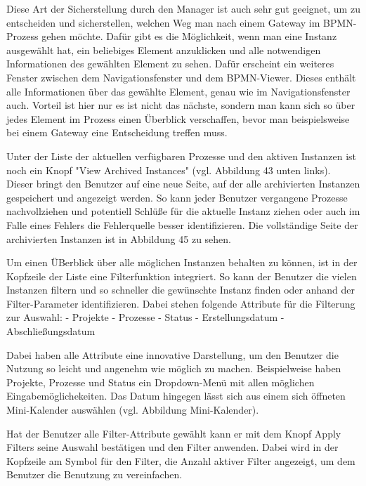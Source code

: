 Diese Art der Sicherstellung durch den Manager ist auch sehr gut geeignet, um zu entscheiden und sicherstellen, welchen Weg man nach einem Gateway im BPMN-Prozess gehen möchte. 
Dafür gibt es die Möglichkeit, wenn man eine Instanz ausgewählt hat, ein beliebiges Element anzuklicken und alle notwendigen Informationen des gewählten Element zu sehen. Dafür erscheint ein weiteres Fenster zwischen dem Navigationsfenster und dem BPMN-Viewer. Dieses enthält alle Informationen über das gewählte Element, genau wie im Navigationsfenster auch. Vorteil ist hier nur es ist nicht das nächste, sondern man kann sich so über jedes Element im Prozess einen Überblick verschaffen, bevor man beispielsweise bei einem Gateway eine Entscheidung treffen muss.


Unter der Liste der aktuellen verfügbaren Prozesse und den aktiven Instanzen ist noch ein Knopf "View Archived Instances" (vgl. Abbildung 43 unten links). Dieser bringt den Benutzer auf eine neue Seite, auf der alle archivierten Instanzen gespeichert und angezeigt werden. So kann jeder Benutzer vergangene Prozesse nachvollziehen und potentiell Schlüße für die aktuelle Instanz ziehen oder auch im Falle eines Fehlers die Fehlerquelle besser identifizieren. 
Die vollständige Seite der archivierten Instanzen ist in Abbildung 45 zu sehen.


Um einen ÜBerblick über alle möglichen Instanzen behalten zu können, ist in der Kopfzeile der Liste eine Filterfunktion integriert. So kann der Benutzer die vielen Instanzen filtern und so schneller die gewünschte Instanz finden oder anhand der Filter-Parameter identifizieren.
Dabei stehen folgende Attribute für die Filterung zur Auswahl:
- Projekte
- Prozesse
- Status
- Erstellungsdatum
- Abschließungsdatum

Dabei haben alle Attribute eine innovative Darstellung, um den Benutzer die Nutzung so leicht und angenehm wie möglich zu machen. Beispielweise haben Projekte, Prozesse und Status ein Dropdown-Menü mit allen möglichen Eingabemöglichekeiten. Das Datum hingegen lässt sich aus einem sich öffneten Mini-Kalender auswählen (vgl. Abbildung Mini-Kalender).


Hat der Benutzer alle Filter-Attribute gewählt kann er mit dem Knopf Apply Filters seine Auswahl bestätigen und den Filter anwenden. Dabei wird in der Kopfzeile am Symbol für den Filter, die Anzahl aktiver Filter angezeigt, um dem Benutzer die Benutzung zu vereinfachen.

